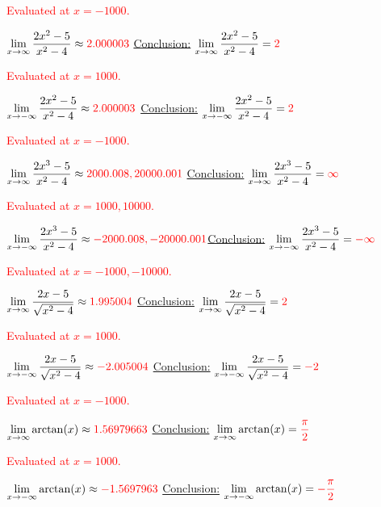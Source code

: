 \documentclass[]{exam}
\numberwithin{equation}{section}
\begin{document}
\begin{questions}
\begin{parts}
\begin{subparts}
	\textcolor{red}{Evaluated at $x = -1000$. }\vfill

	\subpart $\displaystyle \lim_{x\to \infty} \frac{2x^2 - 5}{x^2-4}\approx\textcolor{red}{2.000003}$  \underline{Conclusion:} $\displaystyle \lim_{x\to \infty} \frac{2x^2 - 5}{x^2-4} = \textcolor{red}{2}$ 
	
	\textcolor{red}{Evaluated at $x = 1000$. }\vfill

	\subpart $\displaystyle \lim_{x\to -\infty} \frac{2x^2 - 5}{x^2-4}\approx\textcolor{red}{2.000003}$ \underline{Conclusion:} $\displaystyle \lim_{x\to -\infty} \frac{2x^2 - 5}{x^2-4} = \textcolor{red}{2}$ 
	
	\textcolor{red}{Evaluated at $x = -1000$. }\vfill


	\subpart $\displaystyle \lim_{x\to \infty} \frac{2x^3 - 5}{x^2-4}\approx\textcolor{red}{2000.008, 20000.001}$  \underline{Conclusion:} $\displaystyle \lim_{x\to \infty} \frac{2x^3 - 5}{x^2-4} = \textcolor{red}{\infty}$ 
	
	\textcolor{red}{Evaluated at $x = 1000, 10000$. }\vfill

	\subpart $\displaystyle \lim_{x\to -\infty} \frac{2x^3 - 5}{x^2-4}\approx\textcolor{red}{-2000.008, -20000.001} $\underline{Conclusion:} $\displaystyle \lim_{x\to -\infty} \frac{2x^3 - 5}{x^2-4} = \textcolor{red}{-\infty}$ 
	
	\textcolor{red}{Evaluated at $x = -1000, -10000$. }\vfill


	\subpart $\displaystyle \lim_{x\to \infty} \frac{2x - 5}{\sqrt{x^2-4}}\approx\textcolor{red}{1.995004}$  \underline{Conclusion:} $\displaystyle \lim_{x\to \infty} \frac{2x - 5}{\sqrt{x^2-4}} = \textcolor{red}{2}$ 
	
	\textcolor{red}{Evaluated at $x = 1000$. }\vfill

	\subpart $\displaystyle \lim_{x\to -\infty} \frac{2x - 5}{\sqrt{x^2-4}}\approx\textcolor{red}{-2.005004}$  \underline{Conclusion:} $\displaystyle \lim_{x\to -\infty} \frac{2x - 5}{\sqrt{x^2-4}} = \textcolor{red}{-2}$ 
	
	\textcolor{red}{Evaluated at $x = -1000$. }\vfill


	\subpart $\displaystyle \lim_{x\to \infty} \arctan(x) \approx\textcolor{red}{1.56979663}$  \underline{Conclusion:} $\displaystyle \lim_{x\to \infty} \arctan(x) = \textcolor{red}{\frac{\pi}{2}}$

	\textcolor{red}{Evaluated at $x = 1000$. }\vfill


	\subpart $\displaystyle \lim_{x\to -\infty} \arctan(x) \approx\textcolor{red}{-1.5697963}$  \underline{Conclusion:} $\displaystyle \lim_{x\to -\infty}\arctan(x) = \textcolor{red}{-\frac{\pi}{2}}$


\end{subparts}
\end{parts}
\end{questions}
\end{document}

